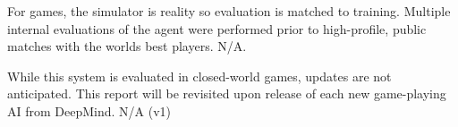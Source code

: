 \documentclass[12pt, a4paper, twocolumn]{article}
\begin{document}
\Evaluation
{For games, the simulator is reality so evaluation is matched to training.
}
{Multiple internal evaluations of the agent were performed prior to high-profile, public matches with the worlds best players. 
}
{}
{N/A.}

\Maintenance
{While this system is evaluated in closed-world games, updates are not anticipated.}
{This report will be revisited upon release of each new game-playing AI from DeepMind.}
{N/A (v1)}











\end{document}
